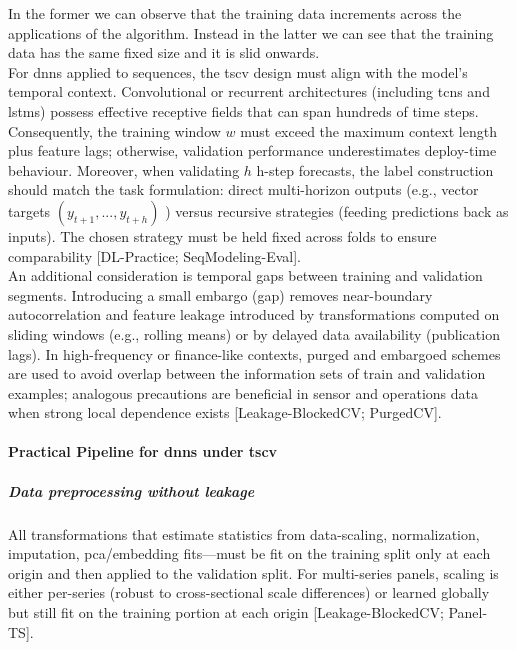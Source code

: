 In the former we can observe that the training data increments across the applications of the algorithm. Instead in the latter we can see that the training data has the same fixed size and it is slid onwards. \\

For \acrshort{dnns} applied to sequences, the \acrshort{tscv} design must align with the model’s temporal context. Convolutional or recurrent architectures (including \acrshort{tcns} and \acrshort{lstm}s) possess effective receptive fields that can span hundreds of time steps. Consequently, the training window $w$ must exceed the maximum context length plus feature lags; otherwise, validation performance underestimates deploy-time behaviour.  Moreover, when validating $h$ h-step forecasts, the label construction should match the task formulation: direct multi-horizon outputs (e.g., vector targets $(y_{t+1}, ..., y_{t+h})$ ) versus recursive strategies (feeding predictions back as inputs). The chosen strategy must be held fixed across folds to ensure comparability [DL-Practice; SeqModeling-Eval].\\

An additional consideration is temporal gaps between training and validation segments. Introducing a small embargo (gap) removes near-boundary autocorrelation and feature leakage introduced by transformations computed on sliding windows (e.g., rolling means) or by delayed data availability (publication lags). In high-frequency or finance-like contexts, purged and embargoed schemes are used to avoid overlap between the information sets of train and validation examples; analogous precautions are beneficial in sensor and operations data when strong local dependence exists [Leakage-BlockedCV; PurgedCV].


\paragraph{Practical Pipeline for \acrshort{dnns} under \acrshort{tscv}}

\subparagraph{Data preprocessing without leakage}
 
 All transformations that estimate statistics from data-scaling, normalization, imputation, \acrfull{pca}/embedding fits—must be fit on the training split only at each origin and then applied to the validation split. For multi-series panels, scaling is either per-series (robust to cross-sectional scale differences) or learned globally but still fit on the training portion at each origin [Leakage-BlockedCV; Panel-TS].

